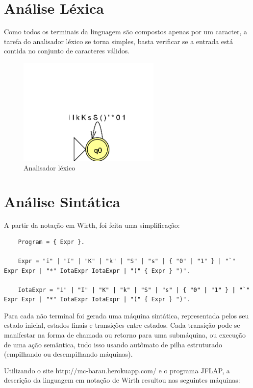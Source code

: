 \section{Análise Léxica}

Como todos os terminais da linguagem são compostos apenas por um caracter, a tarefa do analisador léxico se torna simples, basta verificar se a entrada está contida no conjunto de caracteres válidos.

\begin{figure}[H]
\centering
\includegraphics[width=7cm,keepaspectratio]{jflap-automatas/lexico.png}
\caption{\label{fig:jflap-lexico} Analisador léxico}
\end{figure}

\section{Análise Sintática}

A partir da notação em Wirth, foi feita uma simplificação:

\begin{lstlisting}
    Program = { Expr }.

    Expr = "i" | "I" | "K" | "k" | "S" | "s" | { "0" | "1" } | "`" Expr Expr | "*" IotaExpr IotaExpr | "(" { Expr } ")".
    
    IotaExpr = "i" | "I" | "K" | "k" | "S" | "s" | { "0" | "1" } | "`" Expr Expr | "*" IotaExpr IotaExpr | "(" { Expr } ")".
\end{lstlisting}

Para cada não terminal foi gerada uma máquina sintática, representada pelos seu estado inicial, estados finais e  transições entre estados. Cada transição pode se manifestar na forma de chamada ou retorno para uma submáquina, ou execução de uma ação semântica, tudo isso usando autômato de pilha estruturado (empilhando ou desempilhando máquinas).

Utilizando o site http://mc-barau.herokuapp.com/ e o programa JFLAP, a descrição da linguagem em notação de Wirth resultou nas seguintes máquinas:

